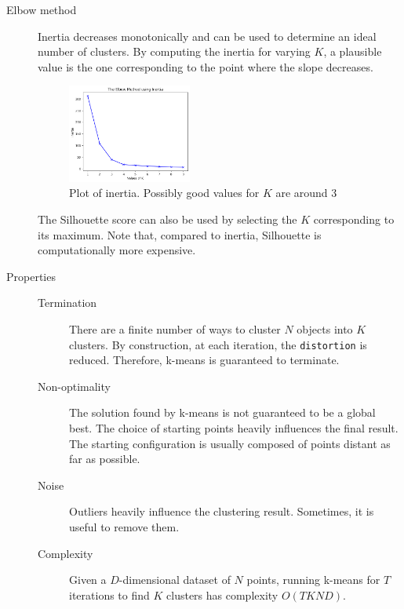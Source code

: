 \begin{description}
    \item[Elbow method]
        Inertia decreases monotonically and can be used to determine an ideal number of clusters.
        By computing the inertia for varying $K$, a plausible value is the one corresponding to the point where the slope decreases.
        \begin{figure}[H]
            \centering
            \includegraphics[width=0.4\textwidth]{img/elbow_method.png}
            \caption{Plot of inertia. Possibly good values for $K$ are around 3}
        \end{figure}

        The Silhouette score can also be used by selecting the $K$ corresponding to its maximum.
        Note that, compared to inertia, Silhouette is computationally more expensive.

    \item[Properties] \phantom{}
        \begin{description}
            \item[Termination] 
                There are a finite number of ways to cluster $N$ objects into $K$ clusters.
                By construction, at each iteration, the \texttt{distortion} is reduced.
                Therefore, k-means is guaranteed to terminate.

            \item[Non-optimality] 
                The solution found by k-means is not guaranteed to be a global best.
                The choice of starting points heavily influences the final result. 
                The starting configuration is usually composed of points distant as far as possible.

            \item[Noise]
                Outliers heavily influence the clustering result. Sometimes, it is useful to remove them.

            \item[Complexity]
                Given a $D$-dimensional dataset of $N$ points,
                running k-means for $T$ iterations to find $K$ clusters has complexity $O(TKND)$.
        \end{description}
\end{description}



